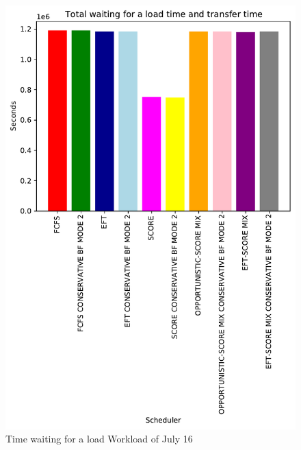 \documentclass[conference,10pt]{IEEEtran}
\begin{document}
\begin{figure}\centering\includegraphics[width=1\linewidth]{../MBSS/plot/Results_FCFS_Score_Backfill_2022-07-16->2022-07-16_V10000_Total_waiting_for_a_load_time_and_transfer_time_450_128_32_256_4_1024.pdf}\caption{Time waiting for a load Workload of July 16}\end{figure}
\end{document}
